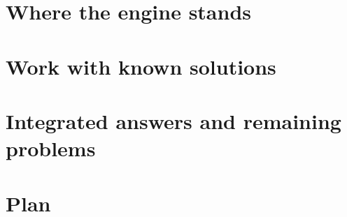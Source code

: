 \clearpage
\tableofcontents
\clearpage

\part{Where the engine stands}




\part{Work with known solutions}



\part{Integrated answers and remaining problems}









\part{Plan}







